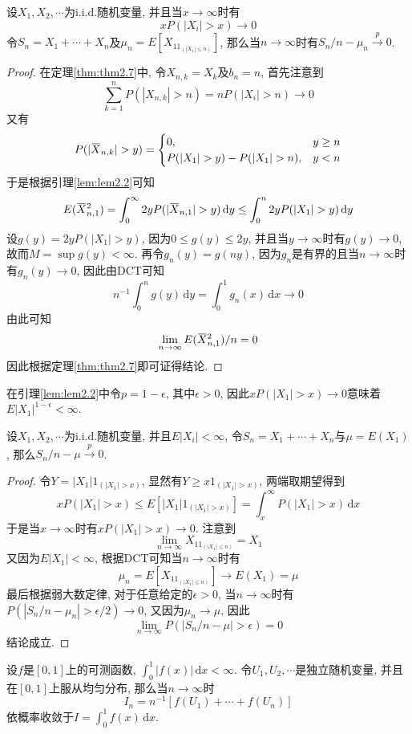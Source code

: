 \documentclass[cn, 12pt, math=mtpro2, bibstyle=apa, blue, twocol]{elegantbook}
\newcommand{\limn}{\lim_{n\to\infty}}
\newcommand{\overbar}[1]{\mkern 1.5mu\overline{\mkern-1.5mu#1\mkern-1.5mu}\mkern 1.5mu}
\begin{document}
\begin{theorem}[弱大数定律]\label{thm:thm2.8}
  设$X_1,X_2,\cdots$为i.i.d.随机变量, 并且当$x\to\infty$时有
  $$xP(|X_i|>x)\to0$$
  令$S_n=X_1+\cdots+X_n$及$\mu_n=E[X_11_{(|X_1|\leq n)}]$, 那么当$n\to\infty$时有$S_n/n-\mu_n\xrightarrow{p}0$.
\end{theorem}
\begin{proof}
  在定理\ref{thm:thm2.7}中, 令$X_{n,k}=X_k$及$b_n=n$, 首先注意到
  $$\sum_{k=1}^{n}P(|X_{n,k}|>n)=nP(|X_i|>n)\to 0$$
  又有
  $$P(|\overbar{X}_{n,k}|>y)=\begin{cases}
      0, & y\geq n \\
      P(|X_1|>y)-P(|X_1|>n), & y<n
    \end{cases}$$
  于是根据引理\ref{lem:lem2.2}可知
  $$E(\overbar{X}_{n,1}^2)=\int_{0}^{\infty}2yP(|\overbar{X}_{n,1}|>y)\,\text{d}y\leq\int_{0}^{n}2yP(|X_1|>y)\,\text{d}y$$
  设$g(y)=2yP(|X_1|>y)$, 因为$0\leq g(y)\leq 2y$, 并且当$y\to\infty$时有$g(y)\to 0$, 故而$M=\sup g(y)<\infty$. 再令$g_n(y)=g(ny)$, 因为$g_n$是有界的且当$n\to\infty$时有$g_n(y)\to0$, 因此由DCT可知
  $$n^{-1}\int_{0}^{n}g(y)\,\text{d}y=\int_{0}^{1}g_n(x)\,\text{d}x\to0$$
  由此可知
  $$\limn E(\overbar{X}_{n,1}^2)/n=0$$
  因此根据定理\ref{thm:thm2.7}即可证得结论.

\end{proof}
\begin{remark}
在引理\ref{lem:lem2.2}中令$p=1-\epsilon$, 其中$\epsilon>0$, 因此$xP(|X_1|>x)\to0$意味着$E|X_1|^{1-\epsilon}<\infty$.
\end{remark}
\begin{theorem}[Khinchin弱大数定律]
  设$X_1,X_2,\cdots$为i.i.d.随机变量, 并且$E|X_i|<\infty$, 令$S_n=X_1+\cdots+X_n$与$\mu=E(X_1)$, 那么$S_n/n-\mu\xrightarrow{p}0$.
\end{theorem}
\begin{proof}
  令$Y=|X_1|1_{(|X_1|>x)}$, 显然有$Y\geq x1_{(|X_1|>x)}$, 两端取期望得到
  $$xP(|X_1|>x)\leq E[|X_1|1_{(|X_1|>x)}]=\int_{x}^{\infty}P(|X_1|>x)\,\text{d}x$$
  于是当$x\to\infty$时有$xP(|X_1|>x)\to0$. 注意到
  $$\limn X_11_{(|X_1|\leq n)}=X_1$$
  又因为$E|X_1|<\infty$, 根据DCT可知当$n\to\infty$时有
  $$\mu_n=E[X_11_{(|X_1|\leq n)}]\to E(X_1)=\mu$$
  最后根据弱大数定律, 对于任意给定的$\epsilon>0$, 当$n\to\infty$时有$P(|S_n/n-\mu_n|>\epsilon/2)\to0$, 又因为$\mu_n\to\mu$, 因此
  $$\limn P(|S_n/n-\mu|>\epsilon)=0$$
  结论成立.
\end{proof}
\begin{example} 设$f$是$[0,1]$上的可测函数, $\int_ {0}^{1}|f(x)|\,\text{d}x<\infty$. 令$U_1,U_2,\cdots$是独立随机变量, 并且在$[0,1]$上服从均匀分布, 那么当$n\to\infty$时
$$I_n=n^{-1}[f(U_1)+\cdots+f(U_n)]$$
依概率收敛于$I=\int_{0}^{1}f(x)\,\text{d}x$.
\end{example}
\end{document}
